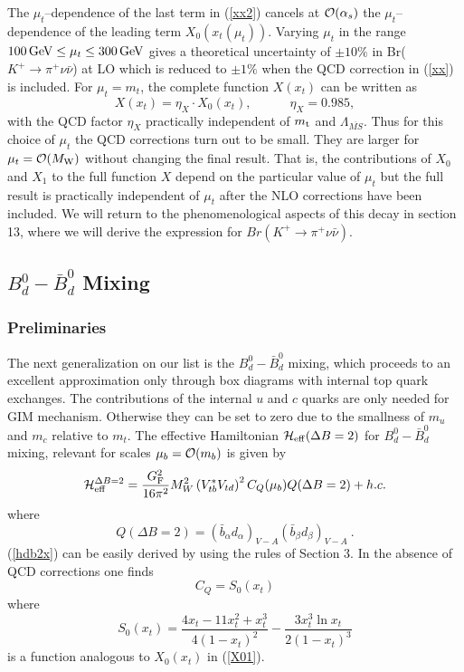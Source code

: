 \documentclass[12pt]{article}
\def\as{\alpha_s}
\def\Heff{{\cal H}_{\rm eff}}
\newcommand{\mt}{m_{\rm t}}
\newcommand{\mw}{M_{\rm W}}
\newcommand{\gev}{\, {\rm GeV}}
\newcommand{\be}{\begin{equation}}
\newcommand{\ee}{\end{equation}}
\newcommand{\ord}{{\cal O}}
\def\kpnn{$K^+\rightarrow\pi^+\nu\bar\nu$}
\begin{document}
\begin{itemize}
\begin{itemize}
The $\mu_t$--dependence of the last term in (\ref{xx2}) cancels at
$\ord(\as)$ the $\mu_t$--dependence of the leading term 
$X_0(x_t(\mu_t))$.
Varying $\mu_t$ in the range  $100\gev\le\mu_t\le 300\gev$ gives
a theoretical uncertainty of $\pm 10 \% $ in Br(\kpnn) at LO which
is reduced to $\pm 1 \% $ when the QCD correction in (\ref{xx}) is
included. 
For $\mu_t=m_t$, the complete function $X(x_t)$ can  be written as
\begin{equation}\label{xeta}
X(x_t)=\eta_X\cdot X_0(x_t), \qquad\quad \eta_X=0.985,
\end{equation}
with the QCD factor $\eta_X$
practically independent of $\mt$ and $\Lambda_{\overline{MS}}$.
Thus for this choice of $\mu_t$ the QCD corrections turn out to
be small. They are larger for $\mu_t=\ord(\mw)$ without changing
the final result. That is, the contributions of $X_0$ and $X_1$
to the full function $X$ depend on the particular value of $\mu_t$
but the full result is practically independent of $\mu_t$ after
the NLO corrections have been included. We will return to the
phenomenological aspects of this decay in section 13, where we
will derive the expression for $Br(K^+\to\pi^+\nu\bar\nu)$.
\subsection{$B^0_d-\bar B^0_d$ Mixing}
\subsubsection{Preliminaries}
The next generalization on our list is the $B^0_d-\bar B^0_d$ mixing,
which proceeds to an excellent approximation only through box diagrams
with internal top quark exchanges. The contributions of the internal
$u$ and $c$ quarks are only needed for GIM mechanism. Otherwise they
can be set to zero due to the smallness of $m_u$ and $m_c$ 
relative to $m_t$. The effective Hamiltonian
$\Heff(\Delta B=2)$ for $B_d^0-\bar B_d^0$
mixing, relevant for scales $\mu_b=\ord(m_b)$ is
given by
\begin{equation}\label{hdb2x}
{\cal H}^{\Delta B=2}_{\rm eff}=\frac{G^2_{\rm F}}{16\pi^2}M^2_W
 \left(V^\ast_{tb}V_{td}\right)^2 
 C_Q(\mu_b) Q(\Delta B=2) + h. c.
\end{equation}
where
\begin{equation}\label{qbdbdx}
Q(\Delta B=2)=(\bar b_\alpha d_\alpha)_{V-A}(\bar b_\beta d_\beta)_{V-A}~.
\end{equation}
(\ref{hdb2x}) can be easily derived by using the rules of Section 3.
In the absence of QCD corrections one finds 
\be
C_Q=S_0(x_t)
\ee
where
\begin{equation}\label{S0a}
S_0(x_t)=\frac{4x_t-11x^2_t+x^3_t}{4(1-x_t)^2}-
 \frac{3x^3_t \ln x_t}{2(1-x_t)^3}
\end{equation}
is a function analogous to $X_0(x_t)$ in (\ref{X01}).

\end{itemize}
\end{itemize}
\end{document}
